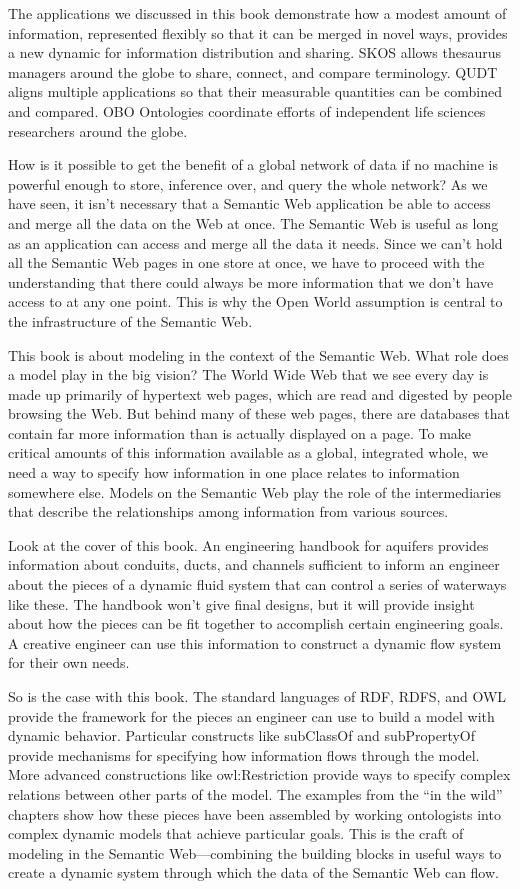 The applications we discussed in this book demonstrate how a modest
amount of information, represented flexibly so that it can be merged in
novel ways, provides a new dynamic for information distribution and
sharing. SKOS allows thesaurus managers around the globe to share,
connect, and compare terminology. QUDT aligns multiple applications so
that their measurable quantities can be combined and compared. OBO
Ontologies coordinate efforts of independent life sciences researchers
around the globe.

How is it possible to get the benefit of a global network of data if no
machine is powerful enough to
store, inference over, and query the whole network? As we have seen, it
isn't necessary that a Semantic Web application be able to access and
merge all the data on the Web at once. The Semantic Web is useful as long
as an application can access and merge all the data it needs. Since we can't hold
all the Semantic Web pages in one store at once, we have to proceed with
the understanding that there could always be more information that we
don't have access to at any one point. This is why the Open World
assumption is central to the infrastructure of the Semantic Web.

This book is about modeling in the context of the Semantic Web. What
role does a model play in the big vision? The World Wide Web that we see
every day is made up primarily of hypertext web pages, which are read and digested
by people browsing the Web. But behind many of these web pages, there
are databases that contain far more information than is actually
displayed on a page. To make critical amounts of this information available as a global,
integrated whole, we need a way to specify how information in one place
relates to information somewhere else. Models on the Semantic Web play
the role of the intermediaries that describe the relationships among
information from various sources.

Look at the cover of this book. An engineering handbook for aquifers
provides information about conduits, ducts, and channels sufficient to
inform an engineer about the pieces of a dynamic fluid system that can
control a series of waterways like these. The handbook won't give final
designs, but it will provide insight about how the pieces can be fit
together to accomplish certain engineering goals. A creative engineer
can use this information to construct a dynamic flow system for their own
needs.

So is the case with this book. The standard languages of RDF, RDFS, and
OWL provide the framework for the pieces an engineer can use to build a
model with dynamic behavior. Particular constructs like subClassOf and
subPropertyOf provide mechanisms for specifying how information flows
through the model. More advanced constructions like owl:Restriction
provide ways to specify complex relations between other parts of the
model. The examples from the ``in the wild'' chapters show how these
pieces have been assembled by working ontologists into complex dynamic
models that achieve particular goals. This is the craft of modeling in
the Semantic Web---combining the building blocks in useful ways to
create a dynamic system through which the data of the Semantic Web can
flow.

